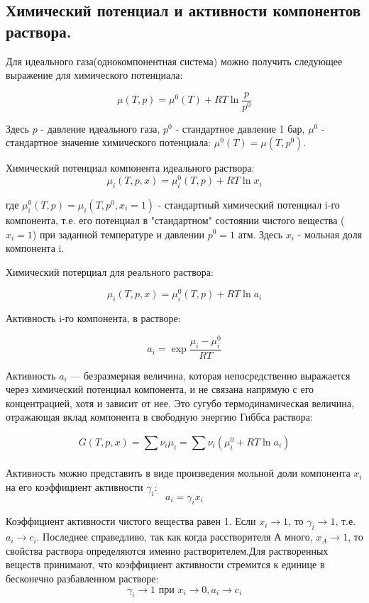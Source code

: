 \documentclass[a4paper,12pt]{article}
\begin{document}
\subsection{Химический потенциал и активности компонентов раствора.}
Для идеального газа(однокомпонентная система) можно получить следующее
выражение для химического потенциала:

\[
\mu(T, p) = \mu^{0}(T) + RT\ln\frac{p}{p^{0}}
\]

Здесь $p$ - давление идеального газа, $p^{0}$ - стандартное давление 1 бар, $ \mu^{0} $ - стандартное значение химического потенциала: $\mu^{0}(T) = \mu(T, p^{0})$.

Химический потенциал компонента идеального раствора:
\[
\mu_{i}(T, p, x) = \mu_{i}^{0}(T, p) + RT\ln x_{i}
\]

где  $\mu_{i}^{0}(T, p) = \mu_{i}(T, p^{0}, x_{i} = 1)$ - стандартный химический потенциал i-го компонента, т.е. его потенциал в "стандартном" состоянии чистого вещества ($x_{i} = 1$) при заданной температуре и давлении $p^{0} = 1 \text{ атм}$. Здесь  $x_{i}$  - мольная доля компонента i.

Химический потерциал для реального раствора:

\[
\mu_{i}(T, p, x) = \mu_{i}^{0}(T, p) + RT\ln a_{i}
\]

Активность i-го компонента, в растворе:

\[
a_{i} = \exp\frac{\mu_{i} - \mu_{i}^{0}}{RT}
\]

Активность $a_{i}$ — безразмерная величина, которая непосредственно выражается через химический потенциал компонента, и не связана напрямую с его концентрацией, хотя и зависит от нее. Это сугубо термодинамическая величина, отражающая вклад компонента в свободную энергию Гиббса раствора:

\[
G(T, p, x) = \sum_{}^{}\nu_{i}\mu_{i} =\sum_{}^{}\nu_{i}(\mu_{i}^{0} + RT\ln a_{i})
\]

Активность можно представить в виде произведения мольной доли компонента $x_{i}$ на его коэффициент активности $\gamma_{i}$:
\[
a_{i} = \gamma_{i}x_{i}
\]
 
Коэффициент активности чистого вещества равен 1. Если $x_{i}\rightarrow1$, то $\gamma_{i} \rightarrow 1$, т.е. $a_{i} \rightarrow c_{i}$. Последнее справедливо, так как когда расстворителя А много, $x_{A} \rightarrow 1 $, то свойства раствора определяются именно растворителем.Для растворенных веществ принимают, что коэффициент активности стремится к единице в бесконечно разбавленном растворе:
\[
 \gamma_{i} \rightarrow 1 \text{ при } x_{i}\rightarrow0,  a_{i} \rightarrow c_{i}
\]
\end{document}
